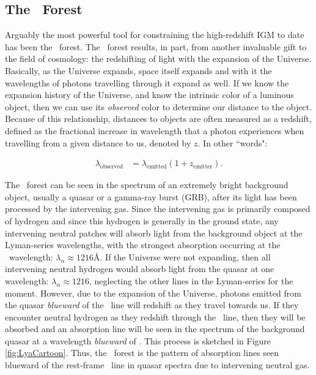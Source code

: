 \subsection{The \lya\ Forest}
Arguably the most powerful tool for constraining the high-redshift IGM to date has been the \lya\ forest. The \lya\ forest results, in part, from another invaluable gift to the field of cosmology: the redshifting of light with the expansion of the Universe. Basically, as the Universe expands, space itself expands and with it the wavelengths of photons travelling through it expand as well. If we know the expansion history of the Universe, and know the intrinsic color of a luminous object, then we can use its \textit{observed} color to determine our distance to the object. Because of this relationship, distances to objects are often measured as a redshift, defined as the fractional increase in wavelength that a photon experiences when travelling from a given distance to us, denoted by $z$. In other ``words": 

\begin{align}
\lambda_{\text{observed}} &= \lambda_{\text{emitted}}(1+z_{\text{emitter}}). 
\end{align}

The \lya\ forest can be seen in the spectrum of an extremely bright background object, usually a quasar or a gamma-ray burst (GRB), after its light has been processed by the intervening gas. Since the intervening gas is primarily composed of hydrogen and since this hydrogen is generally in the ground state, any intervening neutral patches will absorb light from the background object at the Lyman-series wavelengths, with the strongest absorption occurring at the \lya\ wavelength: $\lambda_{\alpha} \approx 1216$\AA. If the Universe were not expanding, then all intervening neutral hydrogen would absorb light from the quasar at one wavelength: $\lambda_{\alpha} \approx 1216$\angstrom, neglecting the other lines in the Lyman-series for the moment. However, due to the expansion of the Universe, photons emitted from the quasar \textit{blueward} of the \lya\ line will redshift as they travel towards us. If they encounter neutral hydrogen as they redshift through the \lya\ line, then they will be absorbed and an absorption line will be seen in the spectrum of the background quasar at a wavelength \textit{blueward} of \lya. This process is sketched in Figure \ref{fig:LyaCartoon}. Thus, the \lya\ forest is the pattern of absorption lines seen blueward of the rest-frame \lya\ line in quasar spectra due to intervening neutral gas. 

